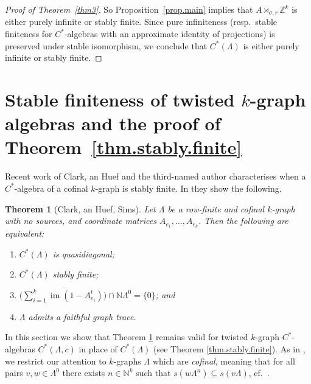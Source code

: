 \documentclass[a4paper, 12pt]{amsart}
\numberwithin{equation}{section}
\newcounter{theorem}
\newtheorem{thm}[theorem]{Theorem}
\theoremstyle{remark}
\theoremstyle{definition}
\begin{document}
\begin{proof}[Proof of Theorem~\ref{thm3}]
So Proposition~\ref{prop.main} implies that $A\rtimes_{\sigma,r} {\mathbb{Z}}^k$ is either purely
infinite or stably finite. Since pure infiniteness (resp.\ stable finiteness for
$C^*$-algebras with an approximate identity of projections) is preserved under stable
isomorphism, we conclude that $C^*(\Lambda)$ is either purely infinite or stably finite.
\end{proof}

\section{Stable finiteness of twisted \texorpdfstring{$k$}{k}-graph algebras and the proof of Theorem~\ref{thm.stably.finite}}
\label{section.ThmE} Recent work \cite{MR3507995} of Clark, an Huef and the third-named
author characterises when a $C^*$-algebra of a cofinal $k$-graph is stably finite. In
\cite[Theorem 1.1.(1)]{MR3507995} they show the following.
\begin{thm}[Clark, an Huef, Sims]\label{thm.stably.finite.untwisted}
Let $\Lambda$ be a row-finite and cofinal $k$-graph with no sources, and coordinate
matrices $A_{e_1}, \dots , A_{e_k}$. Then the following are equivalent:
\begin{enumerate}
\item $C^*(\Lambda)$ is quasidiagonal;
\item $C^*(\Lambda)$ stably finite;
\item $\big(\sum_{i=1}^k{\operatorname{im}}(1-A^t_{e_i}) \big) \cap {\mathbb{N}}{\Lambda^0} = \{0\}$; and
\item $\Lambda$ admits a faithful graph trace.
\end{enumerate}
\end{thm}
In this section we show that Theorem \ref{thm.stably.finite.untwisted} remains valid for
twisted $k$-graph $C^*$-algebras $C^*(\Lambda,c)$ in place of $C^*(\Lambda)$  (see
Theorem \ref{thm.stably.finite}). As in \cite{MR3507995}, we restrict our attention to
$k$-graphs $\Lambda$ which are \emph{cofinal}, meaning that for all pairs $v,w\in
\Lambda^0$ there exists $n\in {\mathbb{N}}^k$ such that $s(w\Lambda^n)\subseteq s(v\Lambda)$, cf.~\cite{MR3444442}.
\end{document}
